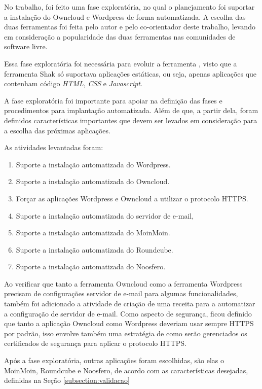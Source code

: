 No trabalho, foi feito uma fase exploratória, no qual o planejamento foi
suportar a instalação do Owncloud e Wordpress de forma 
automatizada. A escolha das duas ferramentas foi feita pelo autor e pelo co-orientador
deste trabalho, levando em consideração a popularidade das duas ferramentas nas 
comunidades de software livre. 

Essa fase exploratória foi necessária para evoluir a ferramenta
, visto que a ferramenta Shak só suportava aplicações estáticas, ou seja, apenas 
aplicações que contenham 
código \textit{HTML}, \textit{CSS} e \textit{Javascript}. 

A fase exploratória foi importante para apoiar na definição das fases e 
procedimentos para implantação
automatizada. Além de que, a partir dela, foram definidos características importantes 
que devem ser levados em consideração para a escolha das próximas aplicações.

As atividades levantadas foram:

 \begin{enumerate}
   \item  Suporte a instalação automatizada do Wordpress.
   \item  Suporte a instalação automatizada do Owncloud.
   \item  Forçar as aplicações Wordpress e Owncloud a
   utilizar o protocolo HTTPS.
   \item  Suporte a instalação automatizada do servidor de e-mail,
   \item  Suporte a instalação automatizada do MoinMoin.
   \item  Suporte a instalação automatizada do Roundcube.
   \item  Suporte a instalação automatizada do Noosfero.
 \end{enumerate}

Ao verificar que tanto a ferramenta Owncloud como a ferramenta Wordpress precisam
de configurações servidor de e-mail para algumas funcionalidades, também foi adicionado
a atividade de criação de uma receita para a automatizar a configuração de
servidor de e-mail. Como aspecto de segurança, ficou definido que tanto a aplicação
Owncloud como Wordpress deveriam usar sempre HTTPS por padrão, isso envolve também
uma estratégia de como serão gerenciados os certificados de segurança para aplicar
o protocolo HTTPS. 

Após a fase exploratória, outras aplicações foram escolhidas, são elas o MoinMoin, 
Roundcube e Noosfero, de acordo com as características desejadas, 
definidas na Seção \ref{subsection:validacao}

